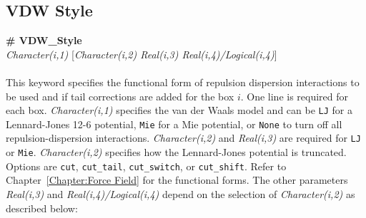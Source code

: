 \subsection{VDW Style}\label{sec:VDW_Style}
{\bf \# VDW\_Style} \\
{\it Character(i,1)} [{\it Character(i,2) Real(i,3) Real(i,4)/Logical(i,4)}] \\ \\
%
This keyword specifies the functional form of repulsion dispersion
interactions to be used and if tail corrections are added for the box $i$. 
One line is required for each box. 
{\it Character(i,1)} specifies the van der Waals model and can be 
\texttt{LJ} for a Lennard-Jones 12-6 potential,
\texttt{Mie} for a Mie potential, 
or \texttt{None} to turn off all repulsion-dispersion interactions. 
{\it Character(i,2)} and {\it Real(i,3)} are required for \texttt{LJ} or \texttt{Mie}. 
{\it Character(i,2)} specifies how the Lennard-Jones potential is truncated.
Options are \texttt{cut}, \texttt{cut\_tail}, \texttt{cut\_switch}, or \texttt{cut\_shift}. 
Refer to Chapter~\ref{Chapter:Force Field} for the functional forms.
The other parameters \emph{Real(i,3)} and \emph{Real(i,4)/Logical(i,4)} depend on the
selection of \emph{Character(i,2)} as described below:
%
